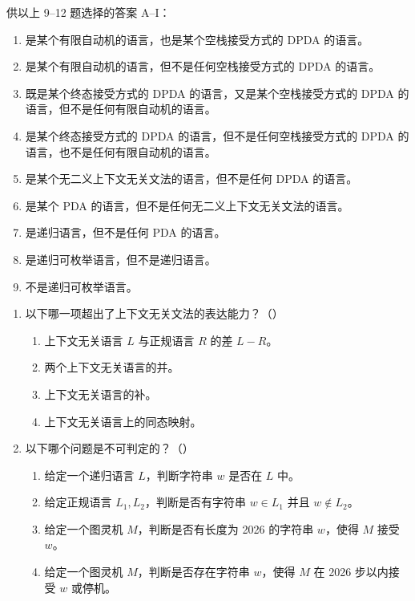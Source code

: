 \documentclass[UTF8,zihao=5]{ctexart}
\newcommand{\ansbox}{\hfill（\hspace{1.6em}）}
\begin{document}
供以上 9--12 题选择的答案 A--I：
\begin{enumerate}[label=\Alph*.]
  \item 是某个有限自动机的语言，也是某个空栈接受方式的 DPDA 的语言。
  \item 是某个有限自动机的语言，但不是任何空栈接受方式的 DPDA 的语言。
  \item 既是某个终态接受方式的 DPDA 的语言，又是某个空栈接受方式的 DPDA 的语言，但不是任何有限自动机的语言。
  \item 是某个终态接受方式的 DPDA 的语言，但不是任何空栈接受方式的 DPDA 的语言，也不是任何有限自动机的语言。
  \item 是某个无二义上下文无关文法的语言，但不是任何 DPDA 的语言。
  \item 是某个 PDA 的语言，但不是任何无二义上下文无关文法的语言。
  \item 是递归语言，但不是任何 PDA 的语言。
  \item 是递归可枚举语言，但不是递归语言。
  \item 不是递归可枚举语言。
\end{enumerate}

\newpage
\begin{enumerate}[start=13]
  \item 以下哪一项超出了上下文无关文法的表达能力？\ansbox
  \begin{enumerate}[label=\Alph*.]
    \item 上下文无关语言 $L$ 与正规语言 $R$ 的差 $L-R$。
    \item 两个上下文无关语言的并。
    \item 上下文无关语言的补。
    \item 上下文无关语言上的同态映射。
  \end{enumerate}

  \item 以下哪个问题是不可判定的？\ansbox
  \begin{enumerate}[label=\Alph*.]
    \item 给定一个递归语言 $L$，判断字符串 $w$ 是否在 $L$ 中。
    \item 给定正规语言 $L_1,L_2$，判断是否有字符串 $w\in L_1$ 并且 $w\notin L_2$。
    \item 给定一个图灵机 $M$，判断是否有长度为 2026 的字符串 $w$，使得 $M$ 接受 $w$。
    \item 给定一个图灵机 $M$，判断是否存在字符串 $w$，使得 $M$ 在 2026 步以内接受 $w$ 或停机。
  \end{enumerate}
\end{enumerate}
\end{document}
